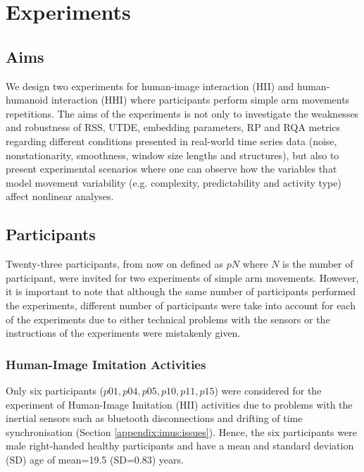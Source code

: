 \chapter{Experiments} \label{chapter4}

%

\graphicspath{{figs/chapter4/PDF/}}



\section{Aims}
We design two experiments for human-image interaction (HII) and 
human-humanoid interaction (HHI) where participants perform simple arm 
movements repetitions.
The aims of the experiments is not only to investigate the weaknesses and 
robustness of RSS, UTDE, embedding parameters, RP and RQA metrics regarding 
different conditions presented in real-world time series data 
(noise, nonstationarity, smoothness, window size lengths and structures), 
but also to present experimental scenarios where one can observe 
how the variables that model movement variability
(e.g. complexity, predictability and activity type)
\citep{stergiou2006, vaillancourt2002, vaillancourt2003}
affect nonlinear analyses.

\section{Participants}
Twenty-three participants, from now on defined as $pN$ where $N$ is the 
number of participant, were invited for two experiments of 
simple arm movements. 
However, it is important to note that although the same number of 
participants performed the experiments, different number of participants 
were take into account for each of the experiments due to either 
technical problems with the sensors or the instructions of the experiments 
were mistakenly given.


\subsection{Human-Image Imitation Activities}
Only six participants ($p01, p04, p05, p10, p11, p15$) were considered 
for the experiment of Human-Image Imitation (HII) activities due to  
problems with the inertial sensors such as bluetooth disconnections and
drifting of time synchronisation (Section \ref{appendix:imus:issues}).
Hence, the six participants were male right-handed healthy participants 
and have a mean and standard deviation (SD) age of mean=19.5 (SD=0.83) years.


